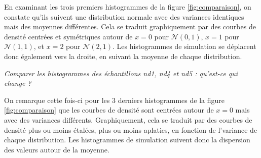             En examinant les trois premiers histogrammes de la figure \ref{fig:comparaison}, on constate qu'ils suivent une distribution normale avec des variances identiques mais des moyennes différentes. 
            Cela se traduit graphiquement par des courbes de densité centrées et symétriques autour de $x=0$ pour $\mathcal{N}(0,1)$, $x=1$ pour $\mathcal{N}(1,1)$, et $x=2$ pour $\mathcal{N}(2,1)$. 
            Les histogrammes de simulation se déplacent donc également vers la droite, en suivant la moyenne de chaque distribution.


            \begin{center}
                \textit{Comparer les histogrammes des échantillons nd1, nd4 et nd5 : qu’est-ce qui change ?}
            \end{center}
            On remarque cette fois-ci pour les 3 derniers histogrammes de la figure \ref{fig:comparaison} que les courbes de densité sont centrées autour de $x=0$ mais avec des variances différents.
            Graphiquement, cela se traduit par des courbes de densité plus ou moins étalées, plus ou moins aplaties, en fonction de l'variance de chaque distribution.
            Les histogrammes de simulation suivent donc la dispersion des valeurs autour de la moyenne. 


